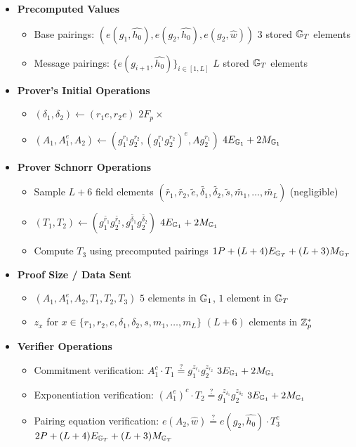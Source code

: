 \begin{itemize}
    \item \textbf{Precomputed Values}
    \begin{itemize}
        \item Base pairings: $(e(g_1, \hat{h_0}), e(g_2, \hat{h_0}), e(g_2, \hat{w}))$ \qquad $3$ stored $\mathbb{G}_T$ elements
        \item Message pairings: $\{e(g_{i+1}, \hat{h_0})\}_{i \in [1,L]}$ \qquad $L$ stored $\mathbb{G}_T$ elements
    \end{itemize}

    \item \textbf{Prover's Initial Operations}
    \begin{itemize}
        \item $(\delta_1, \delta_2) \gets (r_1e, r_2e)$ \qquad $2F_p\times$
        \item $(A_1, A_1^e, A_2) \gets (g_1^{r_1}g_2^{r_2}, (g_1^{r_1}g_2^{r_2})^e, Ag_2^{r_1})$ \qquad $4E_{\mathbb{G}_1} + 2M_{\mathbb{G}_1}$
    \end{itemize}
    
    \item \textbf{Prover Schnorr Operations}
    \begin{itemize}
        \item Sample $L+6$ field elements $(\tilde{r_1}, \tilde{r_2}, \tilde{e}, \tilde{\delta_1}, \tilde{\delta_2}, \tilde{s}, \tilde{m_1},\ldots,\tilde{m_L})$ \qquad (negligible)
        \item $(T_1, T_2) \gets (g_1^{\tilde{r_1}}g_2^{\tilde{r_2}}, g_1^{\tilde{\delta_1}}g_2^{\tilde{\delta_2}})$ \qquad $4E_{\mathbb{G}_1} + 2M_{\mathbb{G}_1}$
        \item Compute $T_3$ using precomputed pairings \qquad $1P + (L+4)E_{\mathbb{G}_T} + (L+3)M_{\mathbb{G}_T}$
    \end{itemize}
    
    \item \textbf{Proof Size / Data Sent}
    \begin{itemize}
        \item $(A_1, A_1^e, A_2, T_1, T_2, T_3)$ \qquad $5$ elements in $\mathbb{G}_1$, $1$ element in $\mathbb{G}_T$
        \item $z_x$ for $x \in \{r_1, r_2, e, \delta_1, \delta_2, s, m_1,\ldots,m_L\}$ \qquad $(L+6)$ elements in $\mathbb{Z}_p^*$
    \end{itemize}
    
    \item \textbf{Verifier Operations}
    \begin{itemize}
        \item Commitment verification: $A_1^c \cdot T_1 \stackrel{?}{=} g_1^{z_{r_1}}g_2^{z_{r_2}}$ \qquad $3E_{\mathbb{G}_1} + 2M_{\mathbb{G}_1}$
        \item Exponentiation verification: $(A_1^e)^c \cdot T_2 \stackrel{?}{=} g_1^{z_{\delta_1}}g_2^{z_{\delta_2}}$ \qquad $3E_{\mathbb{G}_1} + 2M_{\mathbb{G}_1}$
        \item Pairing equation verification: $e(A_2, \widehat{w}) \stackrel{?}{=} e(g_2, \widehat{h_0}) \cdot T_3^c$ \qquad $2P + (L+4)E_{\mathbb{G}_T} + (L+3)M_{\mathbb{G}_T}$
    \end{itemize}
\end{itemize}



